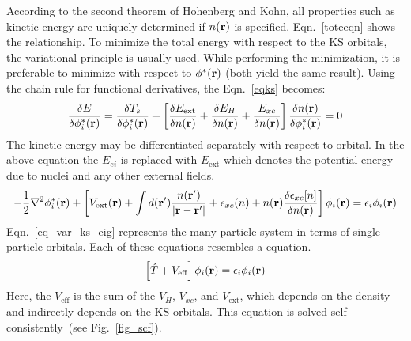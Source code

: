 According to the second theorem of Hohenberg and Kohn, all properties such as kinetic energy are uniquely determined if $n(\vb{r})$ is specified. Eqn.~\eqref{toteeqn} shows the relationship. To minimize the total energy with respect to the KS orbitals, the variational principle is usually used. While performing the minimization, it is preferable to minimize with respect to $\phi^{\ast}(\vb{r})$ (both yield the same result). Using the chain rule for functional derivatives, the Eqn.~\eqref{eqks} becomes:
\begin{equation}
\label{eq_var_ks}
\frac{\delta E}{\delta \phi^{\ast}_i(\vb{r})} = \frac{\delta T_s}{\delta \phi^{\ast}_i(\vb{r})} + \left [ \frac{\delta E_{\text{ext}}}{\delta n(\vb{r})} + \frac{\delta E_H}{\delta n(\vb{r})} + \frac{E_{xc}}{\delta n(\vb{r})}	\right ] \frac{\delta n(\vb{r})}{\delta \phi^{\ast}_i(\vb{r})}  = 0
\end{equation}
The kinetic energy may be differentiated separately with respect to orbital. In the above equation the $E_{ei}$ is replaced with $E_{\text{ext}}$ which denotes the potential energy due to nuclei and any other external fields.
\begin{equation}
\label{eq_var_ks_eig}
-\frac{1}{2} \nabla^2 \phi^{\ast}_i (\vb{r}) + \left [ V_{\text{ext}} (\vb{r}) + \int d(\vb{r'}) \frac{n(\vb{r'})}{\abs{\vb{r}-\vb{r'}}} + \epsilon_{xc} (n) + n(\vb{r}) \frac{\delta \epsilon_{xc}[n]}{\delta n(\vb{r})}   \right ] \phi_i(\vb{r})  = \epsilon_i \phi_i (\vb{r})
\end{equation}
Eqn.~\eqref{eq_var_ks_eig} represents the many-particle system in terms of single-particle orbitals. Each of these equations resembles a \schrod equation.
\begin{equation}
\label{eq_ks_s}
\left [ \hat{T} + V_{\text{eff}}\right ] \phi_i (\vb{r}) = \epsilon_i \phi_i (\vb{r})
\end{equation}
Here, the $V_{\text{eff}}$ is the sum of the $V_H$, $V_{xc}$, and $V_{\text{ext}}$, which depends on the density and indirectly depends on the KS orbitals. This equation is solved self-consistently~(see Fig.~\ref{fig_scf}).
